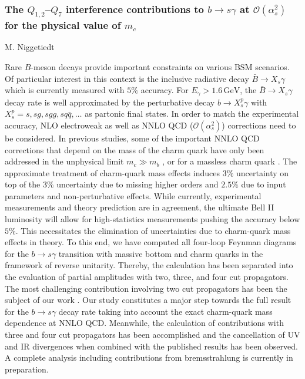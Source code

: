 \documentclass{FBR_Bericht_2025}
\begin{document}
\begin{refsection}
\subsubsection{The $Q_{1,2}$--$Q_7$ interference contributions to $b \to s \gamma$ at ${\mathcal{O}}(\alpha_s^2)$ for the physical value of $m_c$}
\begin{Namen}
M. Niggetiedt
\end{Namen}
%
Rare $B$-meson decays provide important constraints on various BSM scenarios. Of particular interest in this context is the inclusive radiative decay $\bar{B}\to X_s\gamma$ which is currently measured with $5\%$ accuracy. %
For $E_\gamma > 1.6 \,\mathrm{GeV}$, the $\bar{B}\to X_s\gamma$ decay rate is well approximated by the perturbative decay $b\to X_s^p\gamma$ with $X_s^p = s,sg,sgg,sq\bar{q},\ldots$ as partonic final states. 
%
In order to match the experimental accuracy, NLO electroweak as well as NNLO QCD (${\mathcal{O}}(\alpha_s^2)$) corrections need to be considered. In previous studies, some of the important NNLO QCD corrections that depend on the mass of the charm quark have only been addressed in the unphysical limit $m_c \gg m_b$ \cite{Misiak:2010sk}, or for a massless charm quark \cite{Czakon:2015exa}. The approximate treatment of charm-quark mass effects induces $3\%$ uncertainty on top of the $3\%$ uncertainty due to missing higher orders and $2.5\%$ due to input parameters and non-perturbative effects. 
%
While currently, experimental measurements and theory prediction are in agreement, the ultimate Bell II luminosity will allow for high-statistics measurements pushing the accuracy below $5\%$. This necessitates the elimination of uncertainties due to charm-quark mass effects in theory. 
%
To this end, we have computed all four-loop Feynman diagrams for the $b \to s \gamma$ transition with massive bottom and charm quarks in the framework of reverse unitarity. Thereby, the calculation has been separated into the evaluation of partial amplitudes with two, three, and four cut propagators. The most challenging contribution involving two cut propagators has been the subject of our work \cite{Czaja:2023ren}. 
%
Our study constitutes a major step towards the full result for the $b \to s \gamma$ decay rate taking into account the exact charm-quark mass dependence at NNLO QCD. Meanwhile, the calculation of contributions with three and four cut propagators has been accomplished and the cancellation of UV and IR divergences when combined with the published results \cite{Czaja:2023ren} has been observed. A complete analysis including contributions from bremsstrahlung is currently in preparation. 
%


\end{refsection}
\end{document}
